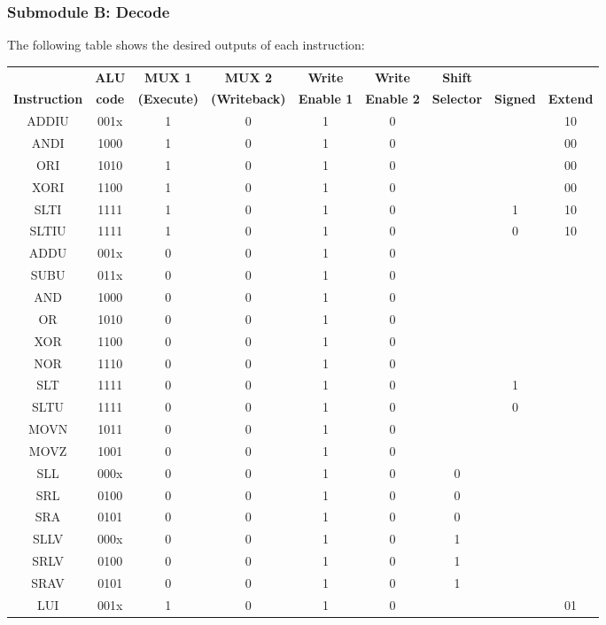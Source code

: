\documentclass{article}
\begin{document}
\subsubsection{Submodule B: Decode}
The following table shows the desired outputs of each instruction:
\small
\begin{center}
\begin{tabular}{|c|c|c|c|c|c|c|c|c|} \hline
& \textbf{ALU} & \textbf{MUX 1} & \textbf{MUX 2} & \textbf{Write} & \textbf{Write} & \textbf{Shift} && \\
\textbf{Instruction} & \textbf{code} & \textbf{(Execute)} & \textbf{(Writeback)} & \textbf{Enable 1} & \textbf{Enable 2} & \textbf{Selector} & \textbf{Signed} & \textbf{Extend}\\ \hline
ADDIU & 001x & 1 & 0 & 1 & 0 &&&10\\ \hline
ANDI & 1000 & 1 & 0 & 1 & 0 &&&00\\ \hline
ORI & 1010 & 1 & 0 & 1 & 0 &&&00\\ \hline
XORI & 1100 & 1 & 0 & 1 & 0 &&&00\\ \hline
SLTI & 1111 & 1 & 0 & 1 & 0 &&1&10\\ \hline
SLTIU & 1111 & 1 & 0 & 1 & 0 &&0&10\\ \hline
ADDU & 001x & 0 & 0 & 1 & 0 &&&\\ \hline
SUBU & 011x & 0 & 0 & 1 & 0 &&&\\ \hline
AND & 1000 & 0 & 0 & 1 & 0 &&&\\ \hline 
OR & 1010 & 0 & 0 & 1 & 0 &&&\\ \hline
XOR & 1100 & 0 & 0 & 1 & 0 &&&\\ \hline
NOR & 1110 & 0 & 0 & 1 & 0 &&&\\ \hline
SLT & 1111 & 0 & 0 & 1 & 0 &&1&\\ \hline
SLTU & 1111 & 0 & 0 & 1 & 0 &&0&\\ \hline
MOVN & 1011 & 0 & 0 & 1 & 0 &&&\\ \hline
MOVZ & 1001 & 0 & 0 & 1 & 0 &&&\\ \hline
SLL & 000x & 0 & 0 & 1 & 0 & 0&&\\ \hline
SRL & 0100 & 0 & 0 & 1 & 0 & 0&&\\ \hline
SRA & 0101 & 0 & 0 & 1 & 0 & 0&&\\ \hline
SLLV & 000x & 0 & 0 & 1 & 0 & 1&&\\ \hline
SRLV & 0100 & 0 & 0 & 1 & 0 & 1&&\\ \hline
SRAV & 0101 & 0 & 0 & 1 & 0 & 1&&\\ \hline
LUI & 001x & 1 & 0 & 1 & 0 &&&01\\ \hline

\end{tabular}
\end{center}
\end{document}
